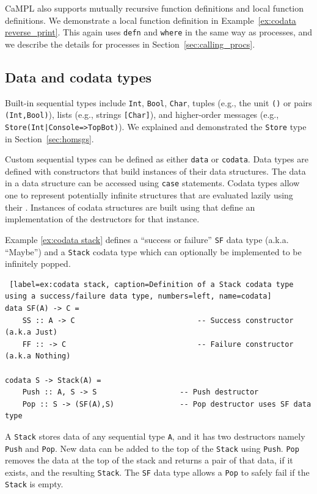 \documentclass[11pt]{article}
\begin{document}
CaMPL also supports mutually recursive function definitions and local function definitions. 
We demonstrate a local function definition in Example~\ref{ex:codata reverse_print}.
This again uses \lstinline$defn$ and \lstinline$where$ in the same way as processes, and we describe the details for processes in Section~\ref{sec:calling_procs}.

\subsection{Data and codata types}
Built-in sequential types include \lstinline$Int$, \lstinline$Bool$, \lstinline$Char$, tuples (e.g., the unit \lstinline$()$ or pairs \lstinline$(Int,Bool)$), lists (e.g., strings \lstinline$[Char]$), and higher-order messages (e.g., \lstinline$Store(Int|Console=>TopBot)$).
We explained and demonstrated the \lstinline$Store$ type in Section~\ref{sec:homsgs}.

Custom sequential types can be defined as either \lstinline{data} or \lstinline{codata}. 
Data types are defined with constructors that build instances of their data structures.
The data in a data structure can be accessed using \lstinline$case$ statements.
Codata types allow one to represent potentially infinite structures that are evaluated lazily using their .
Instances of codata structures are built using  that define an implementation of the destructors for that instance.

Example \ref{ex:codata stack} defines a ``success or failure'' \lstinline{SF} data type (a.k.a. ``Maybe'') and a \lstinline{Stack} codata type which can optionally be implemented to be infinitely popped.
\begin{lstlisting} [label=ex:codata stack, caption=Definition of a Stack codata type using a success/failure data type, numbers=left, name=codata]
data SF(A) -> C =
	SS :: A -> C  							-- Success constructor (a.k.a Just)
	FF :: -> C    							-- Failure constructor (a.k.a Nothing)

codata S -> Stack(A) = 
	Push :: A, S -> S 					-- Push destructor
	Pop :: S -> (SF(A),S)				-- Pop destructor uses SF data type
\end{lstlisting}  
A \lstinline{Stack} stores data of any sequential type \lstinline$A$, and it has two destructors namely \lstinline$Push$ and \lstinline$Pop$. 
New data can be added to the top of the \lstinline{Stack} using \lstinline$Push$.
\lstinline$Pop$ removes the data at the top of the stack and returns a pair of that data, if it exists, and the resulting \lstinline{Stack}.
The \lstinline{SF} data type allows a \lstinline$Pop$ to safely fail if the \lstinline{Stack} is empty.
\end{document}
